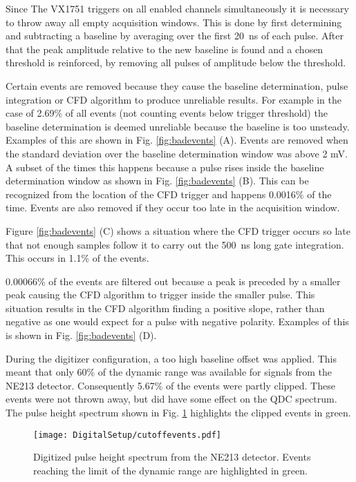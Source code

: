 \documentclass[main.tex]{subfiles}
\begin{document}
Since The VX1751 triggers on all enabled channels simultaneously it is necessary to throw away all empty acquisition windows. This is done by first determining and subtracting a baseline by averaging over the first \si{20\nano\second} of each pulse. After that the peak amplitude relative to the new baseline is found and a chosen threshold is reinforced, by removing all pulses of amplitude below the threshold.

Certain events are removed because they cause the baseline determination, pulse integration or CFD algorithm to produce unreliable results. For example in the case of 2.69\% of all events (not counting events below trigger threshold) the baseline determination is deemed unreliable because the baseline is too unsteady. 
Examples of this are shown in Fig. \ref{fig:badevents} (A). Events are removed when the standard deviation over the baseline determination window was above 2 mV. A subset of the times this happens because a pulse rises inside the baseline determination window as shown in Fig. \ref{fig:badevents} (B). This can be recognized from the location of the CFD trigger and happens 0.0016\% of the time. Events are also removed if they occur too late in the acquisition window. 

Figure \ref{fig:badevents} (C) shows a situation where the CFD trigger occurs so late that not enough samples follow it to carry out the \SI{500}{\nano\second} long gate integration. This occurs in 1.1\% of the events.

0.00066\% of the events are filtered out because a peak is preceded by a smaller peak causing the CFD algorithm to trigger inside the smaller pulse. This situation results in the CFD algorithm finding a positive slope, rather than negative as one would expect for a pulse with negative polarity. Examples of this is shown in Fig. \ref{fig:badevents} (D).

During the digitizer configuration, a too high baseline offset was applied. This meant that only 60\% of the dynamic range was available for signals from the NE213 detector. Consequently 5.67\% of the events were partly clipped. These events were not thrown away, but did have some effect on the QDC spectrum. The pulse height spectrum shown in Fig. \ref{fig:cutoffevents} highlights the clipped events in green.
\begin{figure}[ht!]
    \centering
        \texttt{[image: DigitalSetup/cutoffevents.pdf]}
        \caption[Digitized pulse height spectrum]{Digitized pulse height spectrum from the NE213 detector. Events reaching the limit of the dynamic range are highlighted in green.}
    \label{fig:cutoffevents} 
\end{figure}
\end{document}
